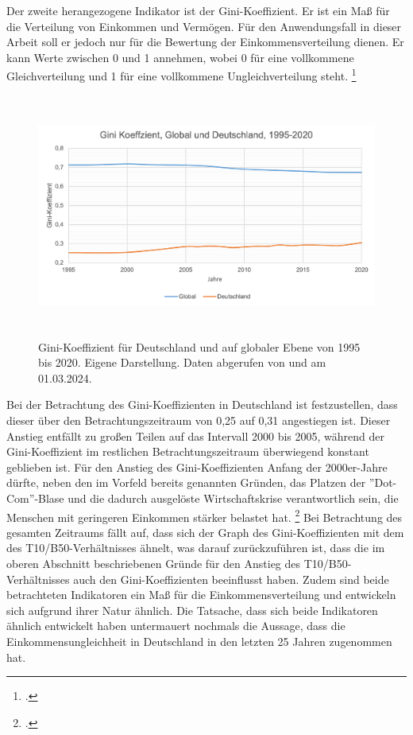 Der zweite herangezogene Indikator ist der Gini-Koeffizient. Er ist ein Ma{\ss} für die Verteilung von Einkommen und Vermögen. Für den Anwendungsfall in dieser Arbeit soll er jedoch nur für die Bewertung der Einkommensverteilung dienen. Er kann Werte zwischen 0 und 1 annehmen, wobei 0 für eine vollkommene Gleichverteilung und 1 für eine vollkommene Ungleichverteilung steht. \footcite[Vgl.][]{gini_definition_diw_2024}

\begin{figure}[h]
    \centering
    \includegraphics[height=8cm]{Bilder/Gini-Koeffizient2.png}
    \caption[Gini-Koeffizient, Deutschland und global, 1995-2020]{Gini-Koeffizient für Deutschland und auf globaler Ebene von 1995 bis 2020. Eigene Darstellung. Daten abgerufen von \cite[][, S.56 (global)]{wir_2022} und \cite[][(Deutschland)]{bmas_arb_gini_2020} am 01.03.2024.}
    \label{fig:iso_norm2}
\end{figure}

Bei der Betrachtung des Gini-Koeffizienten in Deutschland ist festzustellen, dass dieser über den Betrachtungszeitraum von 0,25 auf 0,31 angestiegen ist. Dieser Anstieg entfällt zu gro{\ss}en Teilen auf das Intervall 2000 bis 2005, während der Gini-Koeffizient im restlichen Betrachtungszeitraum überwiegend konstant geblieben ist. Für den Anstieg des Gini-Koeffizienten Anfang der 2000er-Jahre dürfte, neben den im Vorfeld bereits genannten Gründen, das Platzen der ''Dot-Com''-Blase und die dadurch ausgelöste Wirtschaftskrise verantwortlich sein, die Menschen mit geringeren Einkommen stärker belastet hat. \footcite[Vgl. ][S. 3]{horn_wirtschaftskrise_2014} Bei Betrachtung des gesamten Zeitraums fällt auf, dass sich der Graph des Gini-Koeffizienten mit dem des T10/B50-Verhältnisses ähnelt, was darauf zurückzuführen ist, dass die im oberen Abschnitt beschriebenen Gründe für den Anstieg des T10/B50-Verhältnisses auch den Gini-Koeffizienten beeinflusst haben. Zudem sind beide betrachteten Indikatoren ein Ma{\ss} für die Einkommensverteilung und entwickeln sich aufgrund ihrer Natur ähnlich. Die Tatsache, dass sich beide Indikatoren ähnlich entwickelt haben untermauert nochmals die Aussage, dass die Einkommensungleichheit in Deutschland in den letzten 25 Jahren zugenommen hat.

